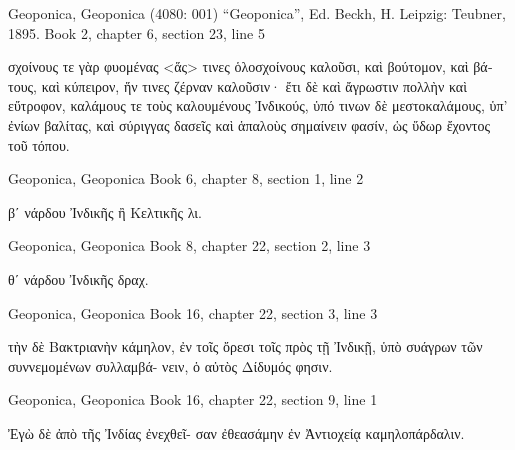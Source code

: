 \documentclass[12pt,letterpaper,twoside,final]{memoir}
\begin{document}
\begin{greek}

Geoponica, Geoponica (4080: 001)
“Geoponica”, Ed. Beckh, H.
Leipzig: Teubner, 1895.
Book 2, chapter 6, section 23, line 5

   σχοίνους 
τε γὰρ φυομένας <ἅς> τινες ὁλοσχοίνους καλοῦσι, καὶ 
βούτομον, καὶ βάτους, καὶ κύπειρον, ἥν τινες ζέρναν 
καλοῦσιν· ἔτι δὲ καὶ ἄγρωστιν πολλὴν καὶ εὔτροφον, 
καλάμους τε τοὺς καλουμένους Ἰνδικούς, ὑπό τινων   
δὲ μεστοκαλάμους, ὑπ' ἐνίων βαλίτας, καὶ σύριγγας 
δασεῖς καὶ ἁπαλοὺς σημαίνειν φασίν, ὡς ὕδωρ ἔχοντος 
τοῦ τόπου. 



Geoponica, Geoponica 
Book 6, chapter 8, section 1, line 2

                        βʹ νάρδου Ἰνδικῆς ἢ Κελτικῆς 
λι. 



Geoponica, Geoponica 
Book 8, chapter 22, section 2, line 3

                                           θʹ νάρδου 
Ἰνδικῆς δραχ. 



Geoponica, Geoponica 
Book 16, chapter 22, section 3, line 3

   τὴν 
δὲ Βακτριανὴν κάμηλον, ἐν τοῖς ὄρεσι τοῖς πρὸς τῇ 
Ἰνδικῇ, ὑπὸ συάγρων τῶν συννεμομένων συλλαμβά-
νειν, ὁ αὐτὸς Δίδυμός φησιν. 



Geoponica, Geoponica 
Book 16, chapter 22, section 9, line 1

   Ἐγὼ δὲ ἀπὸ τῆς Ἰνδίας ἐνεχθεῖ-
σαν ἐθεασάμην ἐν Ἀντιοχείᾳ καμηλοπάρδαλιν. 

\end{greek}
\end{document}

